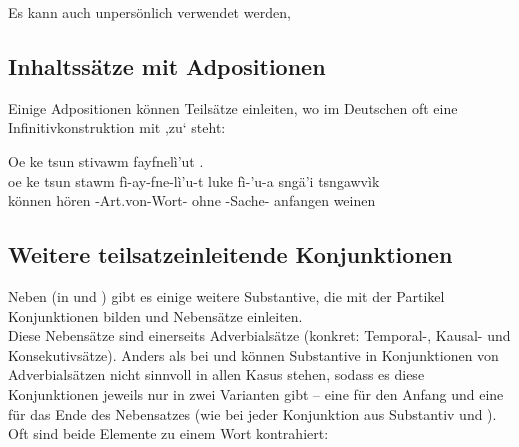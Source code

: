 \noindent Es kann auch unpersönlich verwendet werden,  

\subsection{Inhaltssätze mit Adpositionen} Einige Adpositionen können Teilsätze einleiten, wo im Deutschen oft eine Infinitivkonstruktion mit ,zu‘ steht:\label{syn:rel:nom-adp}

\begin{interlin}
	\glll Oe ke tsun stivawm fayfnelì'ut    . \\
	oe ke tsun stawm fì-ay-fne-lì'u-t luke fì-'u-a sngä'i tsngawvìk \\
	  können hören -Art.von-Wort- ohne -Sache- anfangen weinen \\
\end{interlin}


\subsection{Weitere teilsatzeinleitende Konjunktionen} Neben  (in  und ) gibt es einige weitere Substantive, die mit der Partikel  Konjunktionen bilden und Nebensätze einleiten. \\ 
\indent Diese Nebensätze sind einerseits Adverbialsätze (konkret: Temporal-, Kausal- und Konsekutivsätze). Anders als bei  und  können Substantive in Konjunktionen von Adverbialsätzen nicht sinnvoll in allen Kasus stehen, sodass es diese Konjunktionen jeweils nur in zwei Varianten gibt -- eine für den Anfang und eine für das Ende des Nebensatzes (wie bei jeder Konjunktion aus Substantiv und ). Oft sind beide Elemente zu einem Wort kontrahiert:

